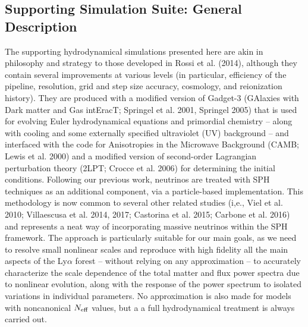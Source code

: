 \documentclass{emulateapj}
\begin{document}

\subsection{Supporting Simulation Suite: General Description}

The supporting hydrodynamical simulations presented here are akin in philosophy and strategy to those developed in Rossi et al. (2014), although they contain
several improvements at various levels (in particular, efficiency of the pipeline, resolution,
grid and step size accuracy, cosmology, and reionization history).  
They are produced with a modified version of Gadget-3 (GAlaxies with Dark matter and Gas intEracT; Springel et al. 2001, Springel 2005) that is used
for evolving Euler hydrodynamical equations and primordial chemistry -- along with cooling and some externally specified ultraviolet (UV) background --
and interfaced with the code for Anisotropies in the Microwave Background (CAMB; Lewis et al. 2000) and a modified version of second-order Lagrangian perturbation theory (2LPT; Crocce et al. 2006) for determining the initial conditions. 
Following our previous work, neutrinos are treated with  
SPH techniques as an additional component, 
via a particle-based implementation. 
This methodology is now common to several other related studies (i,e., Viel et al. 2010; Villaescusa et al. 2014, 2017; Castorina et al. 2015; Carbone et al. 2016) and 
represents a neat way of incorporating  massive neutrinos within the SPH framework. 
The approach is particularly suitable for our main goals, as 
we need to resolve small nonlinear scales and reproduce with high fidelity
all the main aspects of the Ly$\alpha$ forest -- without relying 
on any approximation -- to accurately characterize the
scale dependence of the total matter and flux power spectra due to nonlinear evolution, along with 
 the response of the power spectrum to isolated variations in individual parameters. 
No approximation is also made for models with noncanonical $N_{\rm eff}$ values, but a
a full hydrodynamical treatment is always carried out. 
\end{document}
